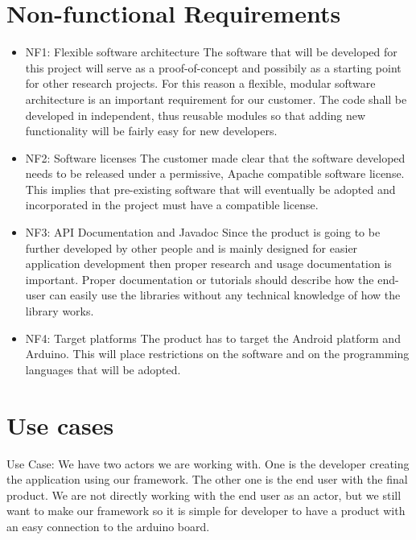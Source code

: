 \section{Non-functional Requirements}

\begin{itemize}
\item{NF1: Flexible software architecture}\newline
The software that will be developed for this project will serve as
a proof-of-concept and possibily as a starting point for other research
projects. For this reason a flexible, modular software architecture
is an important requirement for our customer. The code shall be developed
in independent, thus reusable modules so that adding new functionality
will be fairly easy for new developers.

\item{NF2: Software licenses}\newline
The customer made clear that the software developed needs to be released
under a permissive, Apache compatible software license. This implies
that pre-existing software that will eventually be adopted and incorporated
in the project must have a compatible license.

\item{NF3: API Documentation and Javadoc}\newline
Since the product is going to be further developed by other people and is
mainly designed for easier application development then proper research and usage
documentation is important. Proper documentation or tutorials should describe how
the end-user can easily use the libraries without any technical knowledge of how
the library works.

\item{NF4: Target platforms}\newline
The product has to target the Android platform and Arduino.
This will place restrictions on the software and on the programming languages that will be adopted.
\end{itemize}

\newpage
\section{Use cases}
Use Case:
We have two actors we are working with. One is the developer creating the application using our framework.
The other one is the end user with the final product. We are not directly working with the end user as an actor,
but we still want to make our framework so it is simple for developer to have a product with an easy connection to the arduino board.

